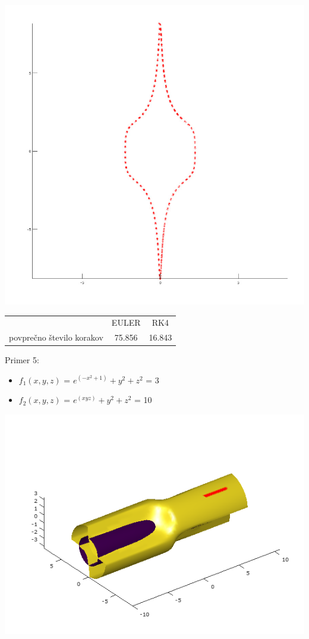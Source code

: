 \documentclass[]{article}
\begin{document}
	\includegraphics[scale=0.3]{primer4_3}
	\begin{center}
	\begin{tabular}{ |c|c|c| } 
 		\hline
 			 & EULER & RK4 \\ 
			povprečno število korakov & 75.856 & 16.843 \\ 
 		\hline
 	\end{tabular}
	\end{center}
	Primer 5:
	\begin{itemize}  
		\item $f_{1}(x,y,z)$ = $e^{(-x^{2}+1)}+y^{2}+z^{2}$ = 3
		\item $f_{2}(x,y,z)$ = $e^{(xyz)}+y^{2}+z^{2}$ = 10
	\end{itemize}
	\includegraphics[scale=0.3]{primer5_1}
\end{document}
